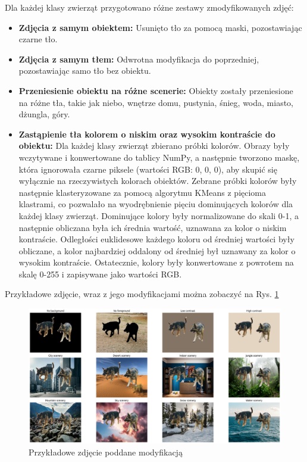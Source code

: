 Dla każdej klasy zwierząt przygotowano różne zestawy zmodyfikowanych zdjęć:
\begin{itemize}
    \item \textbf{Zdjęcia z samym obiektem:} Usunięto tło za pomocą maski, pozostawiając czarne tło.
    \item \textbf{Zdjęcia z samym tłem:} Odwrotna modyfikacja do poprzedniej, pozostawiając samo tło bez obiektu.
    \item \textbf{Przeniesienie obiektu na różne scenerie:} Obiekty zostały przeniesione na różne tła, takie jak niebo, 
    wnętrze domu, pustynia, śnieg, woda, miasto, dżungla, góry.
    \item \textbf{Zastąpienie tła kolorem o niskim oraz wysokim kontraście do obiektu:} Dla każdej klasy zwierząt zbierano próbki kolorów. 
    Obrazy były wczytywane i konwertowane do tablicy NumPy, a następnie tworzono maskę, która ignorowała czarne piksele 
    (wartości RGB: 0, 0, 0), aby skupić się wyłącznie na rzeczywistych kolorach obiektów. Zebrane próbki kolorów były następnie 
    klasteryzowane za pomocą algorytmu KMeans z pięcioma klastrami, co pozwalało na wyodrębnienie pięciu dominujących kolorów dla 
    każdej klasy zwierząt. Dominujące kolory były normalizowane do skali 0-1, a następnie obliczana była ich średnia wartość, 
    uznawana za kolor o niskim kontraście. Odległości euklidesowe każdego koloru od średniej wartości były obliczane, a kolor 
    najbardziej oddalony od średniej był uznawany za kolor o wysokim kontraście. Ostatecznie, kolory były konwertowane z powrotem 
    na skalę 0-255 i zapisywane jako wartości RGB. 
\end{itemize}

Przykładowe zdjęcie, wraz z jego modyfikacjami można zobaczyć na Rys. \ref*{rys:modified}

\begin{figure}
	\centering\includegraphics[width=.9\textwidth]{img/modified}
	\caption{Przykładowe zdjęcie poddane modyfikacją}  \label{rys:modified}
\end{figure}

